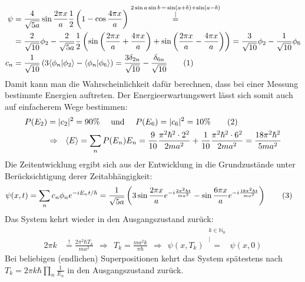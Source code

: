 \documentclass[a4paper,12pt]{article}
\newcommand\numberthis{\addtocounter{equation}{1}\tag{\theequation}}
\newcommand{\bra}{}
\newcommand{\kom}{}
\newcommand{\brak}{}
\newcommand{\kla}{}
\begin{document}
\begin{align*}
\psi &=\frac{4}{\sqrt{5a}}\sin\frac{2\pi x}{a}\frac{1}{2}\kla\left( {1-\cos\frac{4\pi x}{a}} \right)\kom\overset{\substack{{2\sin a\sin b\,=\,\sin(a+b)+\sin (a-b)} \\ |}}{=} \\
&= \frac{2}{\sqrt{10}}\phi_2-\frac{2}{\sqrt{5a}}\frac{1}{2}\kla\left( {\sin\kla\left( {\frac{2\pi x}{a}+\frac{4\pi x}{a}} \right)}+\sin\kla\left( {\frac{2\pi x}{a}-\frac{4\pi x}{a}} \right) \right)=\frac{3}{\sqrt{10}}\phi_2-\frac{1}{\sqrt{10}}\phi_6\\
c_n&=\frac{1}{\sqrt{10}}\kla\left( {3\brak\langle {\phi_n}| {\phi_2}\rangle-\brak\langle {\phi_n}| {\phi_6}\rangle} \right)=\frac{3\delta_{2n}}{\sqrt{10}}-\frac{\delta_{6n}}{\sqrt{10}}\numberthis\label{Koeffizienten}
\end{align*}
Damit kann man die Wahrscheinlichkeit dafür berechnen, dass bei einer Messung bestimmte Energien auftreten. Der Energieerwartungswert lässt sich somit auch auf einfacherem Wege bestimmen:
\begin{align*}
P(E_2)&=|c_2|^2=90\%\ \ \ \ \mathrm{und}\ \ \ \ P(E_6)=|c_6|^2=10\% \numberthis \\
&\Rightarrow\ \ \bra\langle {E}\rangle=\sum_n P(E_n)E_n=\frac{9}{10}\frac{\pi^2\hbar^2\cdot 2^2}{2ma^2}+\frac{1}{10}\frac{\pi^2\hbar^2\cdot 6^2}{2ma^2}=\frac{18\pi^2\hbar^2}{5ma^2}
\end{align*}
Die Zeitentwicklung ergibt sich aus der Entwicklung in die Grundzustände unter Berücksichtigung derer Zeitabhängigkeit:
\begin{align*}
\psi(x,t)&=\sum_nc_n\phi_ne^{-iE_nt/\hbar}=\frac{1}{\sqrt{5a}}\kla\left( {3\sin\frac{2\pi x}{a}e^{-i\frac{2\pi^2\hbar t}{ma^2}}}-\sin\frac{6\pi x}{a}e^{-i\frac{18\pi^2\hbar t}{ma^2}} \right)\numberthis\label{psi von t}
\end{align*}
Das System kehrt wieder in den Ausgangszustand zurück:
\begin{align*}
2\pi k&\overset{!}{=}\frac{2\pi^2\hbar T_k}{ma^2}\ \ \Rightarrow\ \ T_k=\frac{ma^2k}{\pi\hbar}\ \ \Rightarrow\ \ \psi(x,T_k)\kom\overset{\substack{{k\in\mathbb{N}_0} \\ |}}{=}\psi(x,0)
\end{align*}
Bei beliebigen (endlichen) Superpositionen kehrt das System spätestens nach $T_k=2\pi k\hbar\prod_n\frac{1}{E_n}$ in den Ausgangszustand zurück.
\end{document}
